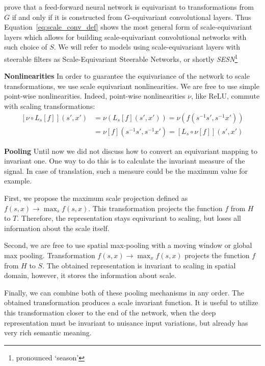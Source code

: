 \documentclass{article} \usepackage{multirow}
\def\Eqref#1{Equation~\ref{#1}}
\begin{document}
\citet{kondor2018generalization} prove that a feed-forward neural network is 
equivariant to transformations from $G$ if and only if it is constructed from G-equivariant
convolutional layers. Thus \Eqref{eq:scale_conv_def} shows the most general 
form of scale-equivariant layers which allows for 
building scale-equivariant convolutional networks with such choice of $S$. 
We will refer to models using scale-equivariant layers with steerable filters as Scale-Equivariant Steerable Networks, 
or shortly \textit{SESN}\footnote{pronounced `season'}

\textbf{Nonlinearities}
In order to guarantee the equivariance of the network to scale transformations, 
we use scale equivariant nonlinearities. We are free to use simple point-wise nonlinearities.
Indeed, point-wise nonlinearities $\nu$, like ReLU, commute with scaling transformations: 
\begin{equation}
    \label{eq:nonlin}
    \begin{split}
        [\nu \circ L_s[f]](s', x')
        &= \nu(L_s[f](s', x'))
        = \nu(f(s^{-1}s', s^{-1}x'))\\
        &= \nu[f](s^{-1}s', s^{-1}x')
        = [L_s \circ \nu[f]](s', x')
    \end{split}
\end{equation}

\textbf{Pooling}
Until now we did not discuss how to convert an equivariant mapping to invariant one. 
One way to do this is to calculate the invariant measure of the signal. 
In case of translation, such a measure could be the maximum value for example. 

First, we propose the maximum scale projection defined as 
$f(s, x) \rightarrow \max_s f(s, x)$. This transformation projects the function $f$ from $H$ 
to $T$. Therefore, the representation stays equivariant to scaling, but loses all information about the scale itself.

Second, we are free to use spatial max-pooling with a moving window or global max pooling.
Transformation $f(s, x) \rightarrow \max_x f(s, x)$ projects the function $f$ from $H$ 
to $S$. The obtained representation is invariant to scaling in spatial domain, 
however, it stores the information about scale.

Finally, we can combine both of these pooling mechanisms in any order. 
The obtained transformation produces a scale invariant function. It is useful 
to utilize this transformation closer to the end of the network, when the deep representation must be invariant to nuisance input variations, but already has very rich semantic meaning. 
\end{document}
